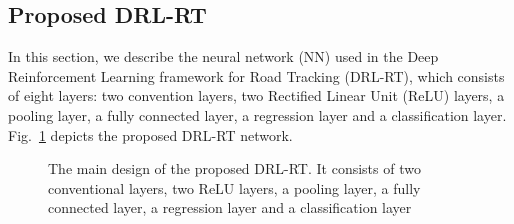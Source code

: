 \documentclass{svproc}
\begin{document}
	\subsection{Proposed DRL-RT} 
	In this section, we describe the neural network (NN) used in the Deep Reinforcement Learning framework for Road Tracking (DRL-RT), which consists of eight layers: two convention layers, two Rectified Linear Unit (ReLU) layers, a pooling layer, a fully connected layer, a regression layer and a classification layer. Fig.~\ref{Fig:Deep_Reinf_Net} depicts the proposed DRL-RT network.
\begin{figure}[!ht]
	\vspace{-6ex}
	\centering
	
	\vspace{-4ex}
	
	\begin{scriptsize}	\caption{The main design of the proposed DRL-RT. It consists of two conventional layers, two ReLU layers, a pooling layer, a fully connected layer, a regression layer and a classification layer\label{Fig:Deep_Reinf_Net}}\end{scriptsize}
	\vspace{-4ex}
\end{figure}
\end{document}
